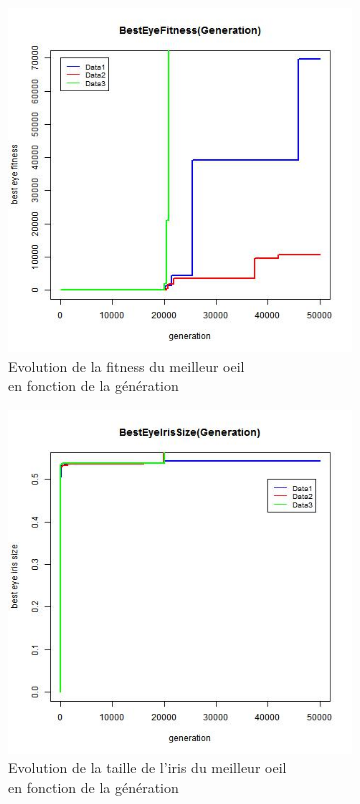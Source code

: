 \documentclass[a4paper,11pt]{article}
\begin{document}
\begin{figure}
\centering
\begin{subfigure}{.5\textwidth}
  \centering
\includegraphics[width=1\linewidth]{best_eye_fitness.jpeg}
\caption{Evolution de la fitness du meilleur oeil \\en fonction de la génération}
\label{fig:best_5}
\end{subfigure}%
\begin{subfigure}{.5\textwidth}
  \centering
\includegraphics[width=1\linewidth]{best_eye_iris_size.jpeg}
\caption{Evolution de la taille de l'iris du meilleur oeil \\en fonction de la génération}
\label{fig:best_6}
\end{subfigure}
\caption{}
\label{fig:test}
\end{figure}
\end{document}
